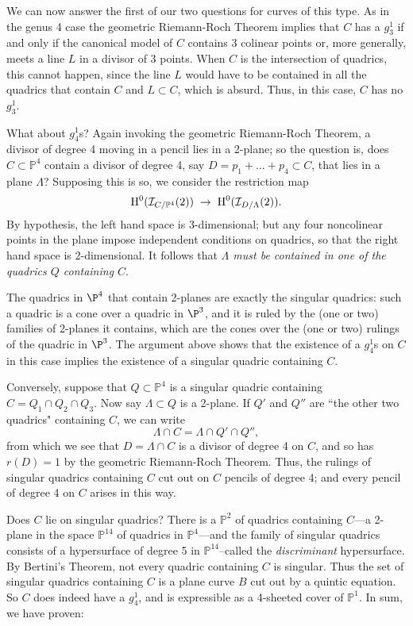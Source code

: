 \documentclass[12pt, leqno]{article}
\def\PP{{\mathbb P}}
\begin{document}
We can now answer the first of our two questions for curves of this type. As in the genus 4 case the geometric Riemann-Roch Theorem implies that $C$ has a $g^1_3$ if and only if the canonical model of $C$ contains 3 colinear points or, more generally, meets a line $L$ in a divisor of 3 points. When $C$ is the intersection of quadrics, this cannot happen, since the line $L$ would have to be contained in all the quadrics that contain $C$ and $L\subset C$, which is absurd. Thus, in this case, 
$C$ has no $g^1_3$.

What about $g^1_4$s? Again invoking the geometric Riemann-Roch Theorem, a divisor of degree 4 moving in a pencil lies in a 2-plane; so the question is, does $C \subset \PP^4$ contain a divisor of degree 4, say $D = p_1+\dots +p_4 \subset C$, that lies in a plane $\Lambda$? Supposing this is so, we consider the restriction map
$$
\HH^0(\cI_{C/\PP^4}(2)) \; \to \; \HH^0(\cI_{D/\Lambda}(2)).
$$
By hypothesis, the left hand space is 3-dimensional; but any four noncolinear points in the plane  impose independent conditions on quadrics,  so that the right hand space is 2-dimensional. It follows that \emph{$\Lambda$ must be contained in one of the quadrics $Q$ containing $C$}. 

The quadrics in $\P^4$ that contain 2-planes are exactly the singular quadrics: such a quadric is a cone over a quadric in $\P^3$, and it is ruled by the (one or two) families of 2-planes it contains, which are the cones over the (one or two) rulings of the quadric in $\P^3$. The argument above shows that the existence of a $g_4^1$s on $C$ in this case implies the existence of a singular quadric containing $C$.

Conversely, suppose that $Q \subset \PP^4$ is a singular quadric containing $C = Q_1 \cap Q_2 \cap Q_3$. Now say $\Lambda \subset Q$ is  a 2-plane. If $Q'$ and $Q''$ are ``the other two quadrics" containing $C$, we can write
$$
\Lambda \cap C = \Lambda \cap Q' \cap Q'', 
$$ 
from which we see that $D = \Lambda \cap C$ is a divisor of degree 4 on $C$, and so has $r(D) = 1$ by the geometric Riemann-Roch Theorem. Thus, the rulings of  singular quadrics containing $C$ cut out on $C$ pencils of degree 4; and every pencil of degree 4 on $C$ arises in this way.

Does $C$ lie on singular quadrics? There is a $\PP^2$ of quadrics containing $C$---a 2-plane in the space $\PP^{14}$ of quadrics in $\PP^4$---and the family of singular quadrics  consists of a  hypersurface of degree 5 in $\PP^{14}$--called the \emph{discriminant} hypersurface. By Bertini's Theorem, not every quadric containing $C$ is singular. Thus the set of singular quadrics containing $C$ is a plane curve $B$ cut out by a quintic equation. So $C$ does indeed have a $g^1_4$, and is expressible as a 4-sheeted cover of $\PP^1$. In sum, we have proven:
\end{document}
